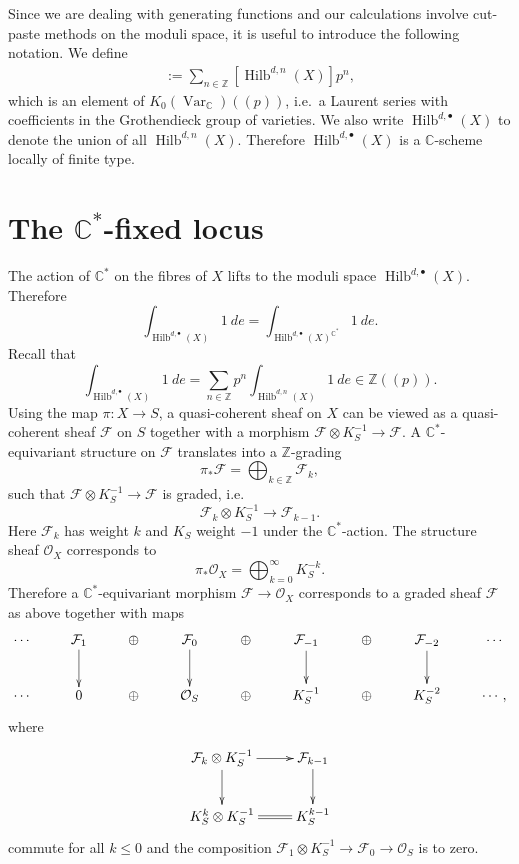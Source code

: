 \documentclass{amsart}
\theoremstyle{definition}
\newcommand{\CC} {\mathbb{C}}          %
\newcommand{\ZZ} {\mathbb{Z}}		%
\renewcommand{\O}{\mathcal{O}}
\newcommand{\Hilb}{\operatorname{Hilb}}
\newcommand{\Var}{\operatorname{Var}}
\newcommand{\F}{\mathcal{F}}
\begin{document}
Since we are dealing with generating functions and our calculations involve cut-paste methods on the moduli space, it is useful to introduce the following notation. We define
\begin{align*}
[\Hilb^{d,\bullet}(X)] := \sum_{n \in \ZZ} [\Hilb^{d,n}(X)] p^n,
\end{align*}
which is an element of $K_0(\Var_{\CC})(\!(p)\!)$, i.e.~a Laurent series with coefficients in the Grothendieck group of varieties. We also write $\Hilb^{d,\bullet}(X)$ to denote the union of all $\Hilb^{d,n}(X)$. Therefore $\Hilb^{d,\bullet}(X)$ is a $\CC$-scheme locally of finite type.


\section{The $\CC^*$-fixed locus} \label{fixedlocus}

The action of $\CC^*$ on the fibres of $X$ lifts to the moduli space $\Hilb^{d,\bullet}(X)$. Therefore
$$
\int_{\Hilb^{d,\bullet}(X)} 1 \ de = \int_{\Hilb^{d,\bullet}(X)^{\CC^*}} 1 \ de.
$$
Recall that 
$$
\int_{\Hilb^{d,\bullet}(X)} 1 \ de = \sum_{n \in \ZZ} p^n \int_{\Hilb^{d,n}(X)} 1 \ de \in \ZZ(\!(p)\!).
$$
Using the map $\pi : X \rightarrow S$, a quasi-coherent sheaf on $X$ can be viewed as a quasi-coherent sheaf $\F$ on $S$ together with a morphism $\F \otimes K_{S}^{-1} \rightarrow \F$. A $\CC^*$-equivariant structure on $\F$ translates into a $\ZZ$-grading
$$
\pi_* \F = \bigoplus_{k \in \ZZ} \F_k,
$$
such that $\F \otimes K_{S}^{-1} \rightarrow \F$ is graded, i.e.
$$
\F_k \otimes K_{S}^{-1} \longrightarrow \F_{k-1}.
$$
Here $\F_k$ has weight $k$ and $K_{S}$ weight $-1$ under the $\CC^*$-action. The structure sheaf $\O_X$ corresponds to 
$$
\pi_* \O_X = \bigoplus_{k=0}^{\infty} K_{S}^{-k}.
$$
Therefore a $\CC^*$-equivariant morphism $\F \rightarrow \O_X$ corresponds to a graded sheaf $\F$ as above together with maps
\begin{displaymath}
\xymatrix
{
\cdots & \F_1 \ar[d] & \oplus & \F_0 \ar[d] & \oplus & \F_{-1} \ar[d] & \oplus & \F_{-2} \ar[d] & \cdots \\
\cdots &  0 & \oplus & \O_S & \oplus & K_{S}^{-1} & \oplus & K_{S}^{-2} & \cdots, 
}
\end{displaymath}
where 
\begin{displaymath}
\xymatrix
{
\F_k \otimes K_{S}^{-1} \ar[r] \ar[d] & \F_{k-1} \ar[d] \\
K_{S}^{k} \otimes K_{S}^{-1} \ar@{=}[r] & K_{S}^{k-1}
}
\end{displaymath}
commute for all $k\leq 0$ and the composition $\F_1 \otimes K_{S}^{-1} \rightarrow \F_0 \rightarrow \O_S$ is to zero. 
\end{document}
